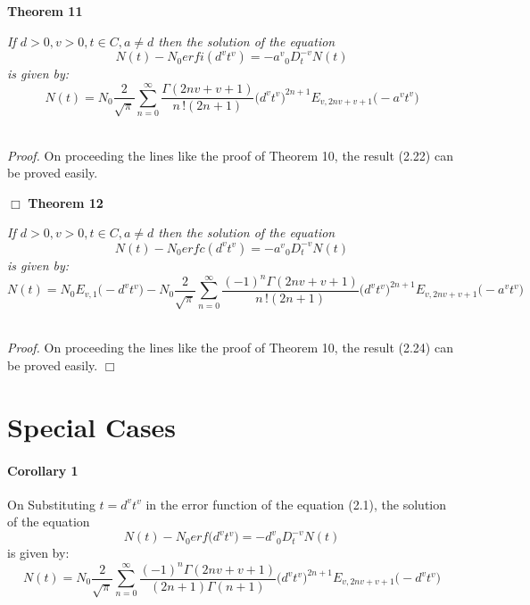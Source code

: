 \documentclass[leqno]{article}
\begin{document}
\noindent
{\bf Theorem 11}
{\it 
If $d > 0, v > 0, t \in C, a \neq d $ then the solution of the equation
\begin{equation}
    N(t) - {N_0}erfi({d^v}{t^v}) = {-a^v}{_0D_t^{-v}}N(t)
\end{equation}
is given by:
\begin{equation}
    N(t) = N_0
    {\frac{2}{\sqrt{\pi}}}
    \sum_{n = 0}^{\infty}
    \frac{\Gamma{(2nv+v+1)}}{{n\,!}(2n+1)}
    \big({d^v}{t^v}\big)^{2n+1}
    E_{v, 2nv+v+1}
    \big(-{a^v}{t^v} \big)
\end{equation}

}
\vspace{0.05in}\\
%
\noindent
{\it Proof.}
On proceeding the lines like the proof of Theorem 10, the result (2.22) can be proved easily.

\hfill$\Box$
\medskip
\noindent
{\bf Theorem 12}
{\it 
If $d > 0, v > 0, t \in C, a \neq d $ then the solution of the equation
\begin{equation}
    N(t) - {N_0}erfc({d^v}{t^v}) = {-a^v}{_0D_t^{-v}}N(t)
\end{equation}
is given by:
\begin{equation}
    N(t)=
    N_0
    E_{v, 1}
    {\big(-{{d^v}}{t^v}\big)}
    -N_0{\frac{2}{\sqrt{\pi}}}
    \sum_{n = 0}^{\infty}
    \frac{(-1)^n\Gamma{(2nv+v+1)}}{n\,!(2n+1)}
    \big({d^v}{t^v}\big)^{2n+1}
    E_{v, 2nv+v+1}
    \big(-{a^v}{t^v})
\end{equation}

}
\vspace{0.05in}\\
%
\noindent
{\it Proof.}
On proceeding the lines like the proof of Theorem 10, the result (2.24) can be proved easily.
\hfill$\Box$
\medskip

\section{Special Cases}
\paragraph{Corollary 1}
On Substituting $t = {d^v}{t^v}$ in the error function of the equation (2.1), the solution of the equation
\begin{equation}
    N(t) -{N_0}erf\big({d^v}{t^v}\big)= {-d^v}{_0D_t^{-v}}N(t)
\end{equation}
is given by:
\begin{equation}
    N(t) = N_0
    {\frac{2}{\sqrt{\pi}}}
    \sum_{n = 0}^{\infty}
    \frac{{(-1)^n}\Gamma{(2nv+v+1)}}{(2n+1)\Gamma{(n+1)}}
    \big({d^v}{t^v}\big)^{2n+1}
    E_{v, 2nv+v+1}
    \big(-{d^v}{t^v}\big)
\end{equation}
\end{document}
